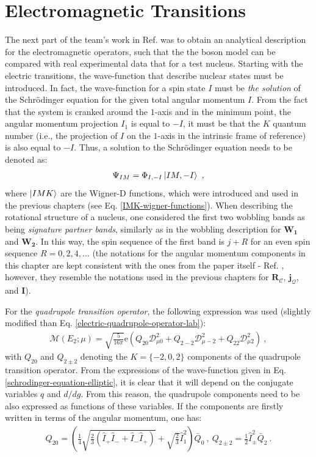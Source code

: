 \section{Electromagnetic Transitions}
\label{section-em-transitions-new-boson}

The next part of the team's work in Ref. \cite{raduta2020approach} was to obtain an analytical description for the electromagnetic operators, such that the the boson model can be compared with real experimental data that for a test nucleus. Starting with the electric transitions, the wave-function that describe nuclear states must be introduced. In fact, the wave-function for a spin state $I$ must be \emph{the solution} of the Schrödinger equation for the given total angular momentum $I$. From the fact that the system is cranked around the $1$-axis and in the minimum point, the angular momentum projection $I_1$ is equal to $-I$, it must be that the $K$ quantum number (i.e., the projection of $I$ on the $1$-axis in the intrinsic frame of reference) is also equal to $-I$. Thus, a solution to the Schrödinger equation needs to be denoted as:
\begin{align}
    \Psi_{IM}=\Phi_{I,-I}\ket{IM,-I}\ ,
\end{align}
where $\ket{IMK}$ are the Wigner-D functions, which were introduced and used in the previous chapters (see Eq. \ref{IMK-wigner-functions}). When describing the rotational structure of a nucleus, one considered the first two wobbling bands as being \emph{signature partner bands}, similarly as in the wobbling description for $\mathbf{W_1}$ and $\mathbf{W_2}$. In this way, the spin sequence of the first band is $j+R$ for an even spin sequence $R=0,2,4,\dots$ (the notations for the angular momentum components in this chapter are kept consistent with the ones from the paper itself - Ref. \cite{raduta2020new}, however, they resemble the notations used in the previous chapters for $\mathbf{R}_\mathscr{C}$, $\mathbf{j}_\mathcal{Q}$, and $\mathbf{I}$).

For the \emph{quadrupole transition operator}, the following expression was used (slightly modified than Eq. \ref{electric-quadrupole-operator-lab}):
\begin{align}
    \mathcal{M}\left(E_2;\mu\right)=\sqrt{\frac{5}{16\pi}}\mathrm{e}\left(Q_{20}\mathcal{D}_{\mu 0}^2+Q_{2-2}\mathcal{D}_{\mu -2}^2+Q_{22}\mathcal{D}_{\mu 2}^2\right)\ ,
\end{align}
with $Q_{20}$ and $Q_{2\pm2}$ denoting the $K=\{-2,0,2\}$ components of the quadrupole transition operator. From the expressions of the wave-function given in Eq. \ref{schrodinger-equation-elliptic}, it is clear that it will depend on the conjugate variables $q$ and $d/dg$. From this reason, the quadrupole components need to be also expressed as functions of these variables. If the components are firstly written in terms of the angular momentum, one has:
\begin{align}
    Q_{20}=\left(\frac{1}{4}\sqrt{\frac{2}{3}\left(\hat{I}_+\hat{I}_-+\hat{I}_-\hat{I}_+\right)}+\sqrt{\frac{2}{3}}\hat{I}_1^2\right)\bar{Q}_0\ ,\ Q_{2\pm2}=\frac{1}{2}\hat{I}_\pm^2\bar{Q}_2\ .
\end{align}


